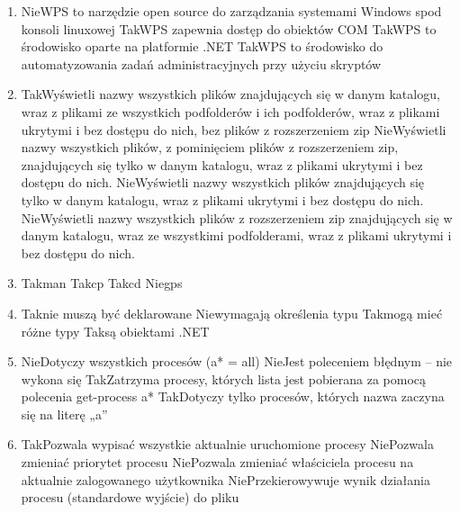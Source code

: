 \begin{enumerate}
		\newpage
		\item {}%
		{Nie}{WPS to narzędzie open source do zarządzania systemami Windows spod konsoli linuxowej}%
		{Tak}{WPS zapewnia dostęp do obiektów COM}%
		{Tak}{WPS to środowisko oparte na platformie .NET}%
		{Tak}{WPS to środowisko do automatyzowania zadań administracyjnych przy użyciu skryptów}
		\item {}%
		{Tak}{Wyświetli nazwy wszystkich plików znajdujących się w danym katalogu, wraz z plikami ze wszystkich podfolderów i ich podfolderów, wraz z plikami ukrytymi i bez dostępu do nich, bez plików z rozszerzeniem zip}%
		{Nie}{Wyświetli nazwy wszystkich plików, z pominięciem plików z rozszerzeniem zip, znajdujących się tylko w danym katalogu, wraz z plikami ukrytymi i bez dostępu do nich.}%
		{Nie}{Wyświetli nazwy wszystkich plików znajdujących się tylko w danym katalogu, wraz z plikami ukrytymi i bez dostępu do nich.}%
		{Nie}{Wyświetli nazwy wszystkich plików z rozszerzeniem zip znajdujących się w danym katalogu, wraz ze wszystkimi podfolderami, wraz z plikami ukrytymi i bez dostępu do nich.}
		\item {}%
		{Tak}{man}%
		{Tak}{cp}%
		{Tak}{cd}%
		{Nie}{gps}
		\item {}%
		{Tak}{nie muszą być deklarowane}%
		{Nie}{wymagają określenia typu}%
		{Tak}{mogą mieć różne typy}%
		{Tak}{są obiektami .NET}
		\item {}%
		{Nie}{Dotyczy wszystkich procesów (a* = all)}%
		{Nie}{Jest poleceniem błędnym – nie wykona się}%
		{Tak}{Zatrzyma procesy, których lista jest pobierana za pomocą polecenia get-process a*}%
		{Tak}{Dotyczy tylko procesów, których nazwa zaczyna się na literę „a”}
		\item {}%
		{Tak}{Pozwala wypisać wszystkie aktualnie uruchomione procesy}%
		{Nie}{Pozwala zmieniać priorytet procesu}%
		{Nie}{Pozwala zmieniać właściciela procesu na aktualnie zalogowanego użytkownika}%
		{Nie}{Przekierowywuje wynik działania procesu (standardowe wyjście) do pliku}
		

\end{enumerate}
